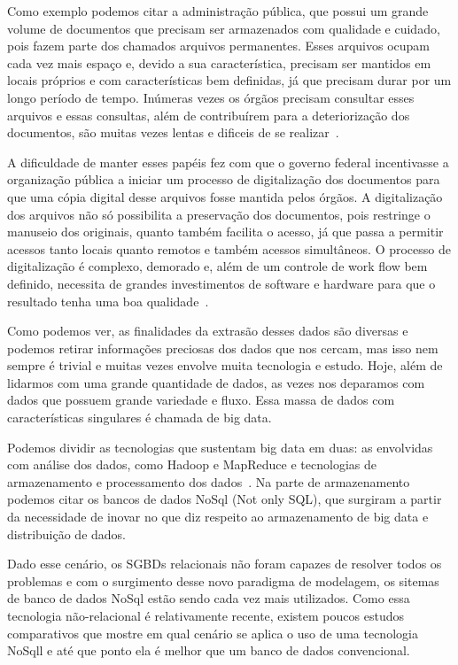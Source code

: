Como exemplo podemos citar a administração pública, que possui um grande volume de documentos que precisam ser armazenados com qualidade e cuidado, pois fazem parte dos chamados arquivos permanentes. Esses arquivos ocupam cada vez mais espaço e, devido a sua característica, precisam ser mantidos em locais próprios e com características bem definidas, já que precisam durar por um longo período de tempo. Inúmeras vezes os órgãos precisam consultar esses arquivos e essas consultas, além de contribuírem para a deteriorização dos documentos, são muitas vezes lentas e dificeis de se realizar~\cite{arqConarq}.

A dificuldade de manter esses papéis fez com que o governo federal incentivasse a organização pública a iniciar um processo de digitalização dos documentos para que uma cópia digital desse arquivos fosse mantida pelos órgãos. A digitalização dos arquivos não só possibilita a preservação dos documentos, pois restringe o manuseio dos originais, quanto também facilita o acesso, já que passa a permitir acessos tanto locais quanto remotos e também acessos simultâneos. O processo de digitalização é complexo, demorado e, além de um controle de work flow bem definido, necessita de grandes investimentos de software e hardware para que o resultado tenha uma boa qualidade~\cite{arqConarq}.

Como podemos ver, as finalidades da extrasão desses dados são diversas e podemos retirar informações preciosas dos dados que nos cercam, mas isso nem sempre é trivial e muitas vezes envolve muita tecnologia e estudo. Hoje, além de lidarmos com uma grande quantidade de dados, as vezes nos deparamos com dados que possuem grande variedade e fluxo. Essa massa de dados com características singulares é chamada de big data.

Podemos dividir as tecnologias que sustentam big data em duas: as envolvidas com análise dos dados, como Hadoop e MapReduce e tecnologias de armazenamento e processamento dos dados~\cite{ibmvcsabeoqebigdata}. Na parte de armazenamento podemos citar os bancos de dados NoSql (Not only SQL), que surgiram a partir da necessidade de inovar no que diz respeito ao armazenamento de big data e distribuição de dados.

Dado esse cenário, os SGBDs relacionais não foram capazes de resolver todos os problemas e com o surgimento desse novo paradigma de modelagem, os sitemas de banco de dados NoSql estão sendo cada vez mais utilizados. Como essa tecnologia não-relacional é relativamente recente, existem poucos estudos comparativos que mostre em qual cenário se aplica o uso de uma tecnologia NoSqll e até que ponto ela é melhor que um banco de dados convencional.

